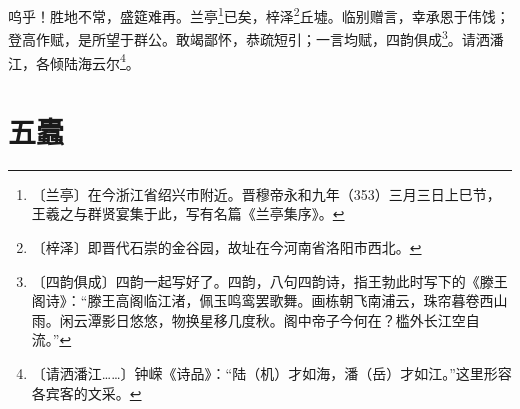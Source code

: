\documentclass[12pt,UTF-8,openany]{ctexbook}
\begin{document}
\begin{normalsize}
    呜乎！胜地不常，盛筵难再。兰亭\footnote{〔兰亭〕在今浙江省绍兴市附近。晋穆帝永和九年（353）三月三日上巳节，王羲之与群贤宴集于此，写有名篇《兰亭集序》。}已矣，梓泽\footnote{〔梓泽〕即晋代石崇的金谷园，故址在今河南省洛阳市西北。}丘墟。临别赠言，幸承恩于伟饯；登高作赋，是所望于群公。敢竭鄙怀，恭疏短引；一言均赋，四韵俱成\footnote{〔四韵俱成〕四韵一起写好了。四韵，八句四韵诗，指王勃此时写下的《滕王阁诗》：“滕王高阁临江渚，佩玉鸣鸾罢歌舞。画栋朝飞南浦云，珠帘暮卷西山雨。闲云潭影日悠悠，物换星移几度秋。阁中帝子今何在？槛外长江空自流。”}。请洒潘江，各倾陆海云尔\footnote{〔请洒潘江……〕钟嵘《诗品》：“陆（机）才如海，潘（岳）才如江。”这里形容各宾客的文采。}。
\end{normalsize}



\chapter{五蠹}
\end{document}
